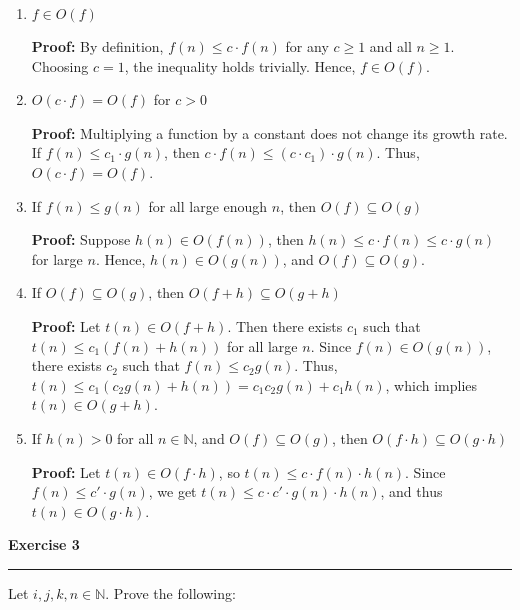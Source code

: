 \documentclass{article}
\theoremstyle{theorem}
\theoremstyle{definition}
\theoremstyle{remark}
\begin{document}
\begin{enumerate}
    \item \( f \in O(f) \)

    \textbf{Proof:} By definition, \( f(n) \leq c \cdot f(n) \) for any \( c \geq 1 \) and all \( n \geq 1 \). Choosing \( c = 1 \), the inequality holds trivially. Hence, \( f \in O(f) \).

    \item \( O(c \cdot f) = O(f) \) for \( c > 0 \)

    \textbf{Proof:} Multiplying a function by a constant does not change its growth rate. If \( f(n) \leq c_1 \cdot g(n) \), then \( c \cdot f(n) \leq (c \cdot c_1) \cdot g(n) \). Thus, \( O(c \cdot f) = O(f) \).

    \item If \( f(n) \leq g(n) \) for all large enough \( n \), then \( O(f) \subseteq O(g) \)

    \textbf{Proof:} Suppose \( h(n) \in O(f(n)) \), then \( h(n) \leq c \cdot f(n) \leq c \cdot g(n) \) for large \( n \). Hence, \( h(n) \in O(g(n)) \), and \( O(f) \subseteq O(g) \).

    \item If \( O(f) \subseteq O(g) \), then \( O(f + h) \subseteq O(g + h) \)

    \textbf{Proof:} Let \( t(n) \in O(f + h) \). Then there exists \( c_1 \) such that \( t(n) \leq c_1(f(n) + h(n)) \) for all large \( n \). Since \( f(n) \in O(g(n)) \), there exists \( c_2 \) such that \( f(n) \leq c_2 g(n) \). Thus, \( t(n) \leq c_1(c_2 g(n) + h(n)) = c_1 c_2 g(n) + c_1 h(n) \), which implies \( t(n) \in O(g + h) \).

    \item If \( h(n) > 0 \) for all \( n \in \mathbb{N} \), and \( O(f) \subseteq O(g) \), then \( O(f \cdot h) \subseteq O(g \cdot h) \)

    \textbf{Proof:} Let \( t(n) \in O(f \cdot h) \), so \( t(n) \leq c \cdot f(n) \cdot h(n) \). Since \( f(n) \leq c' \cdot g(n) \), we get \( t(n) \leq c \cdot c' \cdot g(n) \cdot h(n) \), and thus \( t(n) \in O(g \cdot h) \).
\end{enumerate}

\textbf{Exercise 3}
\vspace{0.5em}
\hrule
\vspace{0.5em}
Let \( i, j, k, n \in \mathbb{N} \). Prove the following:
\end{document}
